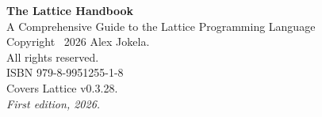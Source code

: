 

\clearpage

\clearpage

\thispagestyle{empty}
\vspace*{\fill}
\begin{flushleft}
  \textbf{The Lattice Handbook}\\
  A Comprehensive Guide to the Lattice Programming Language\\[1em]
  Copyright \textcopyright\ 2026 Alex Jokela.\\
  All rights reserved.\\[1em]
  ISBN 979-8-9951255-1-8\\[1em]
  Covers Lattice v0.3.28.\\[1em]
  \textit{First edition, 2026.}
\end{flushleft}
\vspace*{\fill}

\clearpage

\tableofcontents
